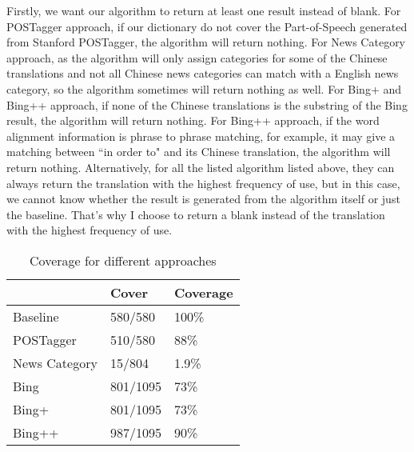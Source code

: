 \documentclass[11pt]{article}
\begin{document}
Firstly, we want our algorithm to return at least one result instead of blank. For POSTagger approach, if our dictionary do not cover the Part-of-Speech generated from Stanford POSTagger, the algorithm will return nothing. For News Category approach, as the algorithm will only assign categories for some of the Chinese translations and not all Chinese news categories can match with a English news category, so the algorithm sometimes will return nothing as well. For Bing+ and Bing++ approach, if none of the Chinese translations is the substring of the Bing result, the algorithm will return nothing. For Bing++ approach, if the word alignment information is phrase to phrase matching, for example, it may give a matching between ``in order to" and its Chinese translation, the algorithm will return nothing. Alternatively, for all the listed algorithm listed above, they can always return the translation with the highest frequency of use, but in this case, we cannot know whether the result is generated from the algorithm itself or just the baseline. That's why I choose to return a blank instead of the translation with the highest frequency of use.

\begin{table}[ht]
  \caption{Coverage for different approaches}
  \label{table:evaluation_1}
  \begin{tabular}{| p{2cm} | p{2cm} | p{2cm} |}
    \hline
     & Cover & Coverage\\
    \hline
    Baseline & 580/580 & 100\%\\
    \hline
    POSTagger & 510/580 & 88\%\\
    \hline
    News Category & 15/804 & 1.9\%\\
    \hline
    Bing & 801/1095 & 73\%\\
    \hline
    Bing+ & 801/1095 & 73\%\\
    \hline
    Bing++ & 987/1095 & 90\%\\
    \hline
  \end{tabular}
\end{table}
\end{document}
